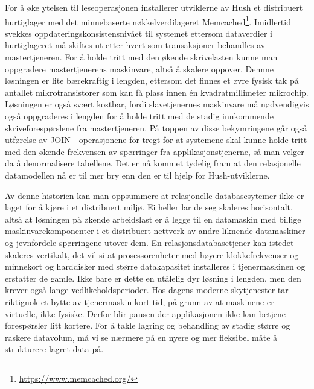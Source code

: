 For å øke ytelsen til leseoperasjonen installerer utviklerne av Hush et distribuert hurtiglager med det minnebaserte nøkkelverdilageret Memcached\footnote{\url{https://www.memcached.org/}}. Imidlertid svekkes oppdateringskonsistensnivået til systemet ettersom dataverdier i hurtiglageret må skiftes ut etter hvert som transaksjoner behandles av mastertjeneren. For å holde tritt med den økende skrivelasten kunne man oppgradere mastertjenerens maskinvare, altså å skalere oppover. Dennne løsningen er lite bærekraftig i lengden, ettersom det finnes et øvre fysisk tak på antallet mikrotransistorer som kan få plass innen én kvadratmillimeter mikrochip. Løsningen er også svært kostbar, fordi slavetjenernes maskinvare må nødvendigvis også oppgraderes i lengden for å holde tritt med de stadig innkommende skriveforespørslene fra mastertjeneren. På toppen av disse bekymringene går også utførelse av JOIN - operasjonene for tregt for at systemene skal kunne holde tritt med den økende frekvensen av spørringer fra applikasjonstjenerne, så man velger da å denormalisere tabellene. Det er nå kommet tydelig fram at den relasjonelle datamodellen nå er til mer bry enn den er til hjelp for Hush-utviklerne.

Av denne historien kan man oppsummere at relasjonelle databasesytemer ikke er laget for å kjøre i et distribuert miljø. Ei heller lar de seg skaleres horisontalt, altså at løsningen på økende arbeidslast er å legge til en datamaskin med billige maskinvarekomponenter i et distribuert nettverk av andre liknende datamaskiner og jevnfordele spørringene utover dem. En relasjonsdatabasetjener kan istedet skaleres vertikalt, det vil si at prosessorenheter med høyere klokkefrekvenser og minnekort og harddisker med større datakapasitet installeres i tjenermaskinen og erstatter de gamle. Ikke bare er dette en utålelig dyr løsning i lengden, men den krever også lange vedlikeholdsperioder. Hos dagens moderne skytjenester tar riktignok et bytte av tjenermaskin kort tid, på grunn av at maskinene er virtuelle, ikke fysiske. Derfor blir pausen der applikasjonen ikke kan betjene forespørsler litt kortere. For å takle lagring og behandling av stadig større og raskere datavolum, må vi se nærmere på en nyere og mer fleksibel måte å strukturere lagret data på.
